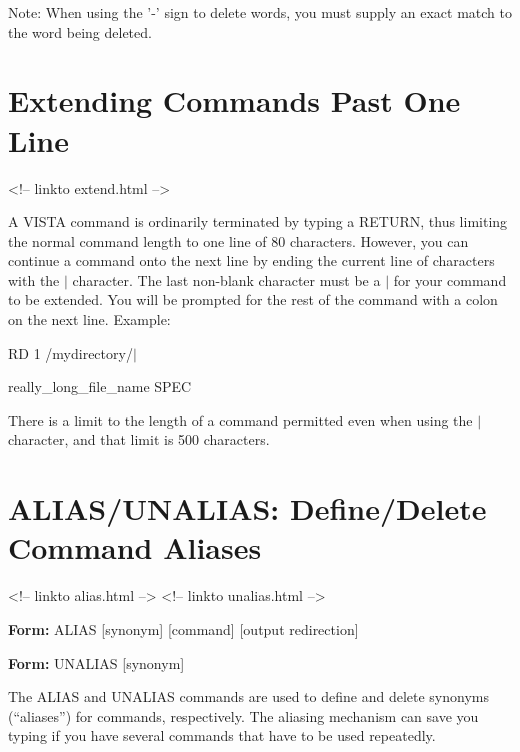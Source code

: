 Note: When using the '-' sign to delete words, you must supply an exact
match to the word being deleted.

\section{Extending Commands Past One Line}
\begin{rawhtml}
<!-- linkto extend.html -->
\end{rawhtml}

A VISTA command is ordinarily terminated by typing a RETURN, thus limiting
the normal command length to one line of 80 characters.  However, you can
continue a command onto the next line by ending the current line of
characters with the $|$ character.  The last non-blank character must be a
$|$ for your command to be extended.  You will be prompted for the rest of
the command with a colon on the next line. Example:

\begin{hanging}
  \item{ RD 1 /mydirectory/$|$}
  \item{really\_long\_file\_name SPEC}
\end{hanging}

There is a limit to the length of a command permitted even when using the
$|$ character, and that limit is 500 characters.

\section{ALIAS/UNALIAS: Define/Delete Command Aliases}
\begin{rawhtml}
<!-- linkto alias.html -->
<!-- linkto unalias.html -->
\end{rawhtml}

\begin{command}
  \item[\textbf{Form: }ALIAS {[synonym]} {[command]} {[output
       redirection]}\hfill]{} 
  \item[\textbf{Form: }UNALIAS {[synonym]}\hfill]{}
\end{command}

The ALIAS and UNALIAS commands are used to define and delete synonyms
(``aliases'') for commands, respectively.  The aliasing mechanism can save
you typing if you have several commands that have to be used repeatedly.


